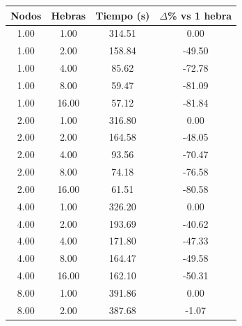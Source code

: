\begin{table}[ht]
    \centering
    \begin{tabular}{|c|c|c|c|}
        \hline
        \textbf{Nodos} & \textbf{Hebras} & \textbf{Tiempo (s)} & \textbf{$\Delta$\% vs 1 hebra} \\
        \hline
        1.00           & 1.00            & 314.51              & 0.00                           \\
        1.00           & 2.00            & 158.84              & -49.50                         \\
        1.00           & 4.00            & 85.62               & -72.78                         \\
        1.00           & 8.00            & 59.47               & -81.09                         \\
        1.00           & 16.00           & 57.12               & -81.84                         \\
        2.00           & 1.00            & 316.80              & 0.00                           \\
        2.00           & 2.00            & 164.58              & -48.05                         \\
        2.00           & 4.00            & 93.56               & -70.47                         \\
        2.00           & 8.00            & 74.18               & -76.58                         \\
        2.00           & 16.00           & 61.51               & -80.58                         \\
        4.00           & 1.00            & 326.20              & 0.00                           \\
        4.00           & 2.00            & 193.69              & -40.62                         \\
        4.00           & 4.00            & 171.80              & -47.33                         \\
        4.00           & 8.00            & 164.47              & -49.58                         \\
        4.00           & 16.00           & 162.10              & -50.31                         \\
        8.00           & 1.00            & 391.86              & 0.00                           \\
        8.00           & 2.00            & 387.68              & -1.07                          \\

\end{tabular}
\end{table}
